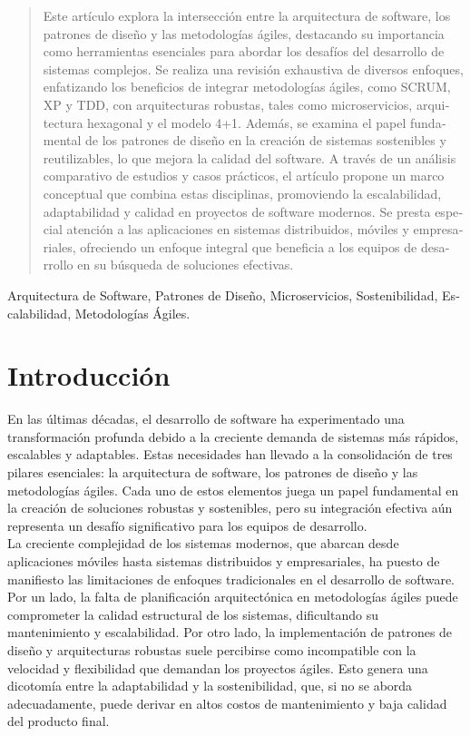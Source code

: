 \documentclass[conference]{IEEEtran}
\begin{document}
\begin{otherlanguage}{spanish}
\begin{abstract}
Este artículo explora la intersección entre la arquitectura de software, los patrones de diseño y las metodologías ágiles, destacando su importancia como herramientas esenciales para abordar los desafíos del desarrollo de sistemas complejos. Se realiza una revisión exhaustiva de diversos enfoques, enfatizando los beneficios de integrar metodologías ágiles, como SCRUM, XP y TDD, con arquitecturas robustas, tales como microservicios, arquitectura hexagonal y el modelo 4+1. Además, se examina el papel fundamental de los patrones de diseño en la creación de sistemas sostenibles y reutilizables, lo que mejora la calidad del software. A través de un análisis comparativo de estudios y casos prácticos, el artículo propone un marco conceptual que combina estas disciplinas, promoviendo la escalabilidad, adaptabilidad y calidad en proyectos de software modernos. Se presta especial atención a las aplicaciones en sistemas distribuidos, móviles y empresariales, ofreciendo un enfoque integral que beneficia a los equipos de desarrollo en su búsqueda de soluciones efectivas.\\
\end{abstract}

\begin{IEEEkeywords}
Arquitectura de Software, Patrones de Diseño, Microservicios, Sostenibilidad, Escalabilidad, Metodologías Ágiles.
\end{IEEEkeywords}
\end{otherlanguage}

\section{Introducción}
En las últimas décadas, el desarrollo de software ha experimentado una transformación profunda debido a la creciente demanda de sistemas más rápidos, escalables y adaptables. Estas necesidades han llevado a la consolidación de tres pilares esenciales: la arquitectura de software, los patrones de diseño y las metodologías ágiles. Cada uno de estos elementos juega un papel fundamental en la creación de soluciones robustas y sostenibles, pero su integración efectiva aún representa un desafío significativo para los equipos de desarrollo.\\

La creciente complejidad de los sistemas modernos, que abarcan desde aplicaciones móviles hasta sistemas distribuidos y empresariales, ha puesto de manifiesto las limitaciones de enfoques tradicionales en el desarrollo de software. Por un lado, la falta de planificación arquitectónica en metodologías ágiles puede comprometer la calidad estructural de los sistemas, dificultando su mantenimiento y escalabilidad. Por otro lado, la implementación de patrones de diseño y arquitecturas robustas suele percibirse como incompatible con la velocidad y flexibilidad que demandan los proyectos ágiles. Esto genera una dicotomía entre la adaptabilidad y la sostenibilidad, que, si no se aborda adecuadamente, puede derivar en altos costos de mantenimiento y baja calidad del producto final.\\
\end{document}

